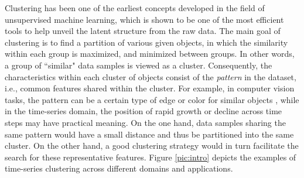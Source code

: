 Clustering has been one of the earliest concepts developed in the field of unsupervised machine learning, which is shown to be one of the most efficient tools to help unveil the latent structure from the raw data. The main goal of clustering is to find a partition of various given objects, in which the similarity within each group is maximized, and minimized between groups. In other words, a group of ``similar" data samples is viewed as a cluster. Consequently, the characteristics within each cluster of objects consist of the \textit{pattern} in the dataset, i.e., common features shared within the cluster. For example, in computer vision tasks, the pattern can be a certain type of edge or color for similar objects \cite{lowe2004distinctive}, while in the time-series domain, the position of rapid growth or decline across time steps may have practical meaning. On the one hand, data samples sharing the same pattern would have a small distance and thus be partitioned into the same cluster. On the other hand, a good clustering strategy would in turn facilitate the search for these representative features. Figure \ref{pic:intro} depicts the examples of time-series clustering across different domains and applications.  


